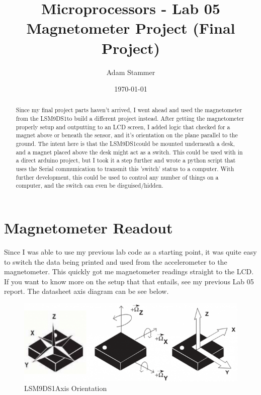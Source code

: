 \documentclass[prb,preprint]{revtex4-1}
\newcommand{\dev}{LSM9DS1} %
\begin{document}
\title{Microprocessors - Lab 05 Magnetometer Project (Final Project)}
\author{Adam Stammer}

\date{\today}

\begin{abstract}
Since my final project parts haven't arrived, I went ahead and used the magnetometer from the \dev to build a different project instead. After getting the magnetometer properly setup and outputting to an LCD screen, I added logic that checked for a magnet above or beneath the sensor, and it's orientation on the plane parallel to the ground. The intent here is that the \dev could be mounted underneath a desk, and a magnet placed above the desk might act as a switch. This could be used with in a direct arduino project, but I took it a step further and wrote a python script that uses the Serial communication to transmit this 'switch' status to a computer. With further development, this could be used to control any number of things on a computer, and the switch can even be disguised/hidden.
\end{abstract}

\maketitle




\section{Magnetometer Readout}
Since I was able to use my previous lab code as a starting point, it was quite easy to switch the data being printed and used from the accelerometer to the magnetometer. This quickly got me magnetometer readings straight to the LCD. If you want to know more on the setup that that entails, see my previous Lab 05 report. The datasheet axis diagram can be see below.

\begin{figure}[H]
	\centering
	\includegraphics[width=5.75in]{axes.png}
	\caption{\dev  Axis Orientation}
	\label{fig1}
\end{figure}
\end{document}
